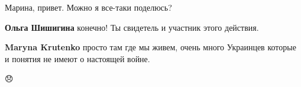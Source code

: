  
 
 
 
 

\qqSecCmt


Марина, привет. Можно я все-таки поделюсь?

\begin{itemize} %
\textbf{Ольга Шишигина} конечно! Ты свидетель и участник этого действия.

\textbf{Maryna Krutenko} просто там где мы живем, очень много Украинцев которые и понятия не имеют о настоящей войне.
\end{itemize} %


😞
